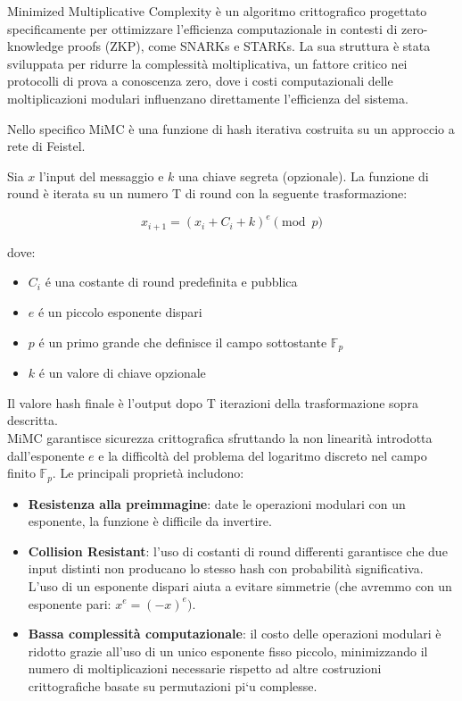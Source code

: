 \cite{albrecht2016mimc}
Minimized Multiplicative Complexity è un algoritmo crittografico progettato specificamente per ottimizzare l'efficienza computazionale in contesti di zero-knowledge proofs (ZKP), come SNARKs e STARKs. La sua struttura è stata sviluppata per ridurre la complessità moltiplicativa, un fattore critico nei protocolli di prova a conoscenza zero, dove i costi computazionali delle moltiplicazioni modulari influenzano direttamente l'efficienza del sistema. 

Nello specifico MiMC è una funzione di hash iterativa costruita su un approccio a rete di Feistel. 

Sia $x$ l'input del messaggio e $k$ una chiave segreta (opzionale). La funzione di round è iterata su un numero T di round con la seguente trasformazione:

$$x_{i+1}=(x_i+C_i+k)^e\pmod{p}$$

dove:

\begin{itemize}
    \item $C_i$ é una costante di round predefinita e pubblica
    \item $e$ é un piccolo esponente dispari
    \item $p$ é un primo grande che definisce il campo sottostante $\mathbb{F}_p$
    \item $k$ é un valore di chiave opzionale
\end{itemize}

Il valore hash finale è l'output dopo T iterazioni della trasformazione sopra descritta. \\

MiMC garantisce sicurezza crittografica sfruttando la non linearità introdotta dall’esponente $e$ e la difficoltà del problema del logaritmo discreto nel campo finito $\mathbb{F}_p$. Le principali proprietà includono:

\begin{itemize}
    \item \textbf{Resistenza alla preimmagine}: date le operazioni modulari con un esponente, la funzione è difficile da invertire.
    \item \textbf{Collision Resistant}: l'uso di costanti di round differenti garantisce che due input distinti non producano lo stesso hash con probabilità significativa. L'uso di un esponente dispari aiuta a evitare simmetrie (che avremmo con un esponente pari: $x^e = (-x)^e)$.
    \item \textbf{Bassa complessità computazionale}: il costo delle operazioni modulari è ridotto grazie all’uso di un unico esponente fisso piccolo, minimizzando il numero di moltiplicazioni necessarie rispetto ad altre costruzioni crittografiche basate su permutazioni pi`u complesse.
\end{itemize}


